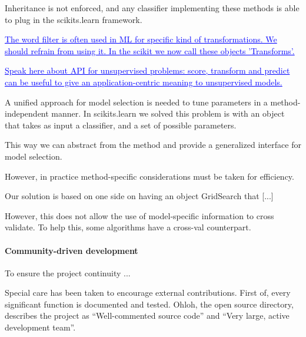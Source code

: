 \documentclass[twoside,11pt]{article}
\newcommand{\GAEL}[1]{\textcolor{blue}{\uline{#1}}}
\begin{document}
Inheritance is not enforced, and any classifier implementing these
methods is able to plug in the scikits.learn framework.



\GAEL{The word filter is often used in ML for specific kind of
transformations. We should refrain from using it. In the scikit we now
call these objects 'Transforms'. }

\GAEL{Speak here about API for unsupervised problems: score, transform and
predict can be useful to give an application-centric meaning to
unsupervised models.}


A unified approach for model selection is needed to tune parameters in
a method-independent manner. In scikits.learn we solved this problem
is with an object that takes as input a classifier, and a set of
possible parameters.


This way we can abstract from the method
and provide a generalized interface for model selection.


However, in practice method-specific considerations must be taken for
efficiency.


Our solution is based on one side on having an object GridSearch that
[...] 

However, this does not allow the use of model-specific information to
cross validate. To help this, some algorithms have a cross-val
counterpart.



\paragraph{Community-driven development}

To ensure the project continuity ...

Special care has been taken to encourage external contributions. First
of, every significant function is documented and tested.  Ohloh, the
open source directory, describes the project as ``Well-commented
source code'' and ``Very large, active development team''.
\end{document}
